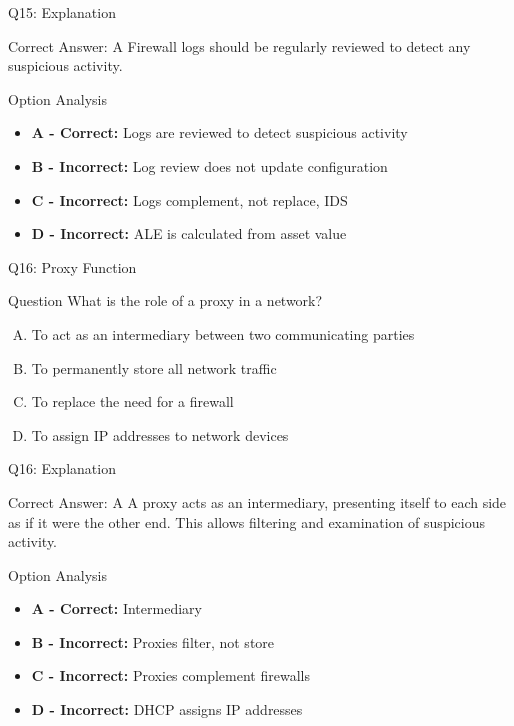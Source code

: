 \documentclass{beamer}
\begin{document}
	\begin{frame}{Q15: Explanation}
		\begin{block}{Correct Answer: A}
			Firewall logs should be regularly reviewed to detect any suspicious activity.
		\end{block}
		\begin{block}{Option Analysis}
			\begin{itemize}
				\item \textbf{A - Correct:} Logs are reviewed to detect suspicious activity
				\item \textbf{B - Incorrect:} Log review does not update configuration
				\item \textbf{C - Incorrect:} Logs complement, not replace, IDS
				\item \textbf{D - Incorrect:} ALE is calculated from asset value
			\end{itemize}
		\end{block}
	\end{frame}
	
	\begin{frame}{Q16: Proxy Function}
		\begin{block}{Question}
			What is the role of a proxy in a network?
		\end{block}
		\begin{enumerate}[(A)]
			\item To act as an intermediary between two communicating parties
			\item To permanently store all network traffic
			\item To replace the need for a firewall
			\item To assign IP addresses to network devices
		\end{enumerate}
	\end{frame}
	
	\begin{frame}{Q16: Explanation}
		\begin{block}{Correct Answer: A}
			A proxy acts as an intermediary, presenting itself to each side as if it were the other end. This allows filtering and examination of suspicious activity.
		\end{block}
		\begin{block}{Option Analysis}
			\begin{itemize}
				\item \textbf{A - Correct:} Intermediary
				\item \textbf{B - Incorrect:} Proxies filter, not store
				\item \textbf{C - Incorrect:} Proxies complement firewalls
				\item \textbf{D - Incorrect:} DHCP assigns IP addresses
			\end{itemize}
		\end{block}
	\end{frame}
	
\end{document}
